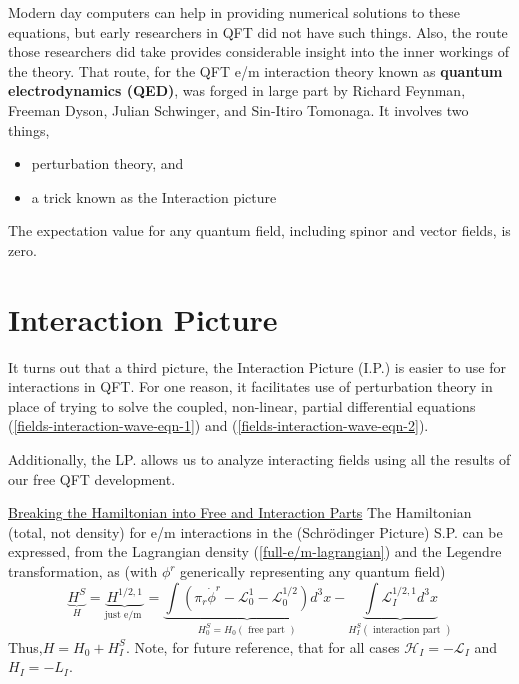 Modern day computers can help in providing numerical solutions to these equations, but early researchers in QFT did not have such things. Also, the route those researchers did take provides considerable insight into the inner workings of the theory. That route, for the QFT e/m interaction theory known as \textbf{quantum electrodynamics (QED)}, was forged in large part by Richard Feynman, Freeman Dyson, Julian Schwinger, and Sin-Itiro Tomonaga. It involves two things,
\begin{itemize}
    \item perturbation theory, and
    \item a trick known as the Interaction picture
\end{itemize}
\begin{qt}
The expectation value for any quantum field, including spinor and vector fields, is zero.
\end{qt}

\section{Interaction Picture}
It turns out that a third picture, the Interaction Picture (I.P.) is easier to use for interactions in
QFT. For one reason, it facilitates use of perturbation theory in place of trying to solve the coupled, non-linear, partial differential equations (\ref{fields-interaction-wave-eqn-1}) and (\ref{fields-interaction-wave-eqn-2}).

Additionally, the LP. allows us to analyze interacting fields using all the results of our free QFT development.

\underline{Breaking the Hamiltonian into Free and Interaction Parts}
The Hamiltonian (total, not density) for e/m interactions in the (Schrödinger Picture) S.P. can be expressed, from the Lagrangian density (\ref{full-e/m-lagrangian}) and the Legendre transformation, as (with $\phi^{r}$ generically representing any quantum field)
\begin{equation}
\underbrace{H^{S}}_{H}=\underbrace{H^{1 / 2,1}}_{\text {just e/m }}=\underbrace{\int\left(\pi_{r} \dot{\phi}^{r}-\mathcal{L}_{0}^{1}-\mathcal{L}_{0}^{1 / 2}\right) d^{3} x}_{H_{0}^{S}=H_{0}(\text { free part })}-\underbrace{\int \mathcal{L}_{I}^{1 / 2,1} d^{3} x}_{H_{I}^{S}(\text { interaction part })}
\end{equation}
Thus,$H=H_{0}+H_{I}^{S}$. Note, for future reference, that for all cases  $\mathcal{H}_{I}=-\mathcal{L}_{I}$ and $ H_{I}=-L_{I}$.


